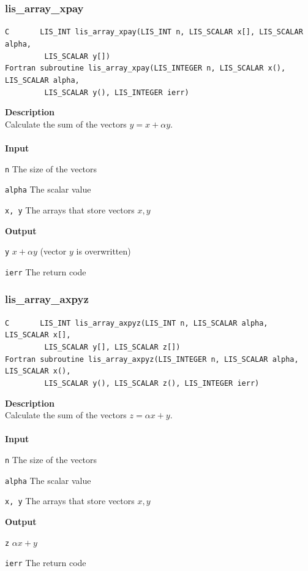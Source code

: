 \documentclass[a4paper]{article}
\newcommand{\namelistlabel}[1]{\mbox{#1}\hfill}
\newenvironment{namelist}[1]{%
\begin{list}{}
  {\let\makelabel\namelistlabel
  \settowidth{\labelwidth}{#1}
  \setlength{\leftmargin}{1.1\labelwidth}}
  }{%
\end{list}}
\begin{document}
\subsubsection{lis\_array\_xpay}
\begin{screen}
\verb|C       LIS_INT lis_array_xpay(LIS_INT n, LIS_SCALAR x[], LIS_SCALAR alpha,|\\
\verb|         LIS_SCALAR y[])|\\
\verb|Fortran subroutine lis_array_xpay(LIS_INTEGER n, LIS_SCALAR x(), LIS_SCALAR alpha,|\\
\verb|         LIS_SCALAR y(), LIS_INTEGER ierr)|
\end{screen}
{\bf Description}\\
\indent
Calculate the sum of the vectors $y = x + \alpha y$.
\\ \\
\noindent
{\bf Input}
\begin{namelist}{XXXXXXXXXXXXXXXXXXXX}
\item[\tt n] The size of the vectors  
\item[\tt alpha] The scalar value
\item[\tt x, y] The arrays that store vectors $x, y$
\end{namelist}
{\bf Output}
\begin{namelist}{XXXXXXXXXXXXXXXXXXXX}
\item[\tt y] $x + \alpha y$ (vector $y$ is overwritten)
\item[\tt ierr] The return code
\end{namelist}

\newpage
\subsubsection{lis\_array\_axpyz}
\begin{screen}
\verb|C       LIS_INT lis_array_axpyz(LIS_INT n, LIS_SCALAR alpha, LIS_SCALAR x[],|\\
\verb|         LIS_SCALAR y[], LIS_SCALAR z[])|\\
\verb|Fortran subroutine lis_array_axpyz(LIS_INTEGER n, LIS_SCALAR alpha, LIS_SCALAR x(),|\\
\verb|         LIS_SCALAR y(), LIS_SCALAR z(), LIS_INTEGER ierr)|
\end{screen}
{\bf Description}\\
\indent
Calculate the sum of the vectors $z = \alpha x + y$.
\\ \\
\noindent
{\bf Input}
\begin{namelist}{XXXXXXXXXXXXXXXXXXXX}
\item[\tt n] The size of the vectors
\item[\tt alpha] The scalar value
\item[\tt x, y] The arrays that store vectors $x, y$
\end{namelist}
{\bf Output}
\begin{namelist}{XXXXXXXXXXXXXXXXXXXX}
\item[\tt z] $\alpha x + y$
\item[\tt ierr] The return code
\end{namelist}
\end{document}
